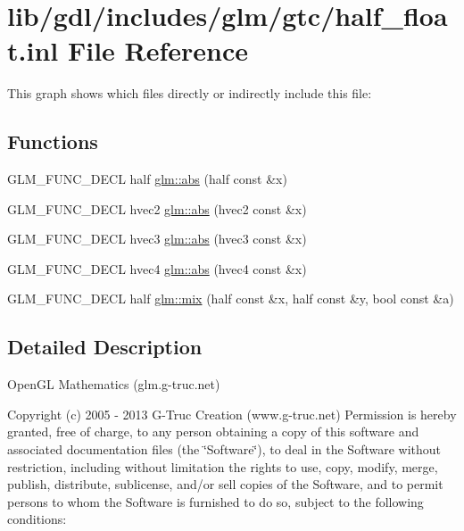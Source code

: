 \hypertarget{half__float_8inl}{}\section{lib/gdl/includes/glm/gtc/half\+\_\+float.inl File Reference}
\label{half__float_8inl}
This graph shows which files directly or indirectly include this file\+:
\subsection*{Functions}
\begin{DoxyCompactItemize}
\item 
G\+L\+M\+\_\+\+F\+U\+N\+C\+\_\+\+D\+E\+C\+L half \hyperlink{group__gtc__half__float_ga7baeb4a0d33ef51c77ef5b69fe5a18d3}{glm\+::abs} (half const \&x)
\item 
G\+L\+M\+\_\+\+F\+U\+N\+C\+\_\+\+D\+E\+C\+L hvec2 \hyperlink{group__gtc__half__float_ga45cfe493b84a3defa8ee522dba1db7ad}{glm\+::abs} (hvec2 const \&x)
\item 
G\+L\+M\+\_\+\+F\+U\+N\+C\+\_\+\+D\+E\+C\+L hvec3 \hyperlink{group__gtc__half__float_ga239a9e24147a79fb9e7ae39454258966}{glm\+::abs} (hvec3 const \&x)
\item 
G\+L\+M\+\_\+\+F\+U\+N\+C\+\_\+\+D\+E\+C\+L hvec4 \hyperlink{group__gtc__half__float_ga8b3b9d614c70a6b70eabb7c908f90cd6}{glm\+::abs} (hvec4 const \&x)
\item 
G\+L\+M\+\_\+\+F\+U\+N\+C\+\_\+\+D\+E\+C\+L half \hyperlink{group__gtc__half__float_gad404634256be379c3e205f75d096c43c}{glm\+::mix} (half const \&x, half const \&y, bool const \&a)
\end{DoxyCompactItemize}


\subsection{Detailed Description}
Open\+G\+L Mathematics (glm.\+g-\/truc.\+net)

Copyright (c) 2005 -\/ 2013 G-\/\+Truc Creation (www.\+g-\/truc.\+net) Permission is hereby granted, free of charge, to any person obtaining a copy of this software and associated documentation files (the \char`\"{}\+Software\char`\"{}), to deal in the Software without restriction, including without limitation the rights to use, copy, modify, merge, publish, distribute, sublicense, and/or sell copies of the Software, and to permit persons to whom the Software is furnished to do so, subject to the following conditions\+:

